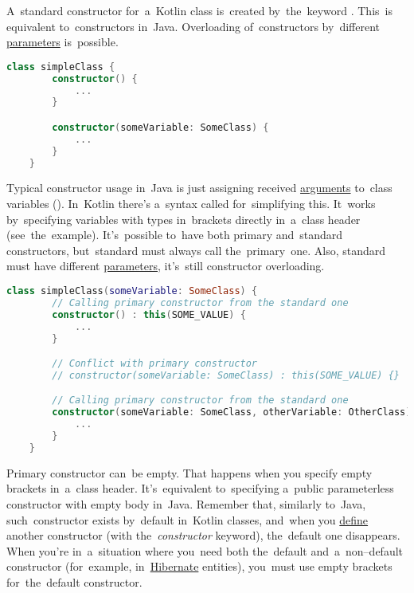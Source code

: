 \label{kotlin}

\label{kotlinconstructor}
A~standard constructor for~a~Kotlin class is~created by~the~keyword .
This~is equivalent to~constructors in~Java.
Overloading of~constructors by~different \hyperref[parameterargument]{parameters} is~possible.

\begin{lstlisting}[language=Kotlin]
    class simpleClass {
        constructor() {
            ...
        }

        constructor(someVariable: SomeClass) {
            ...
        }
    }
\end{lstlisting}

\label{kotlinprimaryconstructor}
Typical constructor usage in~Java is just assigning received \hyperref[parameterargument]{arguments} to~class variables ().
In~Kotlin there's a~syntax called  for~simplifying this.
It~works by~specifying variables with types in~brackets directly in~a~class header (see~the~example).
It's~possible to~have both primary and~standard constructors, but~standard must always call the~primary~one.
Also, standard must have different \hyperref[parameterargument]{parameters}, it's~still constructor overloading.
\newpage

\begin{lstlisting}[language=Kotlin]
    class simpleClass(someVariable: SomeClass) {
        // Calling primary constructor from the standard one
        constructor() : this(SOME_VALUE) {
            ...
        }

        // Conflict with primary constructor
        // constructor(someVariable: SomeClass) : this(SOME_VALUE) {}

        // Calling primary constructor from the standard one
        constructor(someVariable: SomeClass, otherVariable: OtherClass) : this(SOME_VALUE) {
            ...
        }
    }
\end{lstlisting}
\newline

\noindent Primary constructor can~be empty.
That happens when you specify empty brackets in~a~class header.
It's~equivalent to~specifying a~public parameterless constructor with empty body in~Java.
Remember that, similarly to~Java, such~constructor exists by~default in~Kotlin classes, and~when you \hyperref[declarationdefinition]{define} another constructor (with the~\textit{constructor} keyword), the~default one disappears.
When you're in~a~situation where you~need both the~default and~a~non--default constructor (for~example, in~\hyperref[hibernate]{Hibernate} entities), you~must use empty brackets for~the~default constructor.

